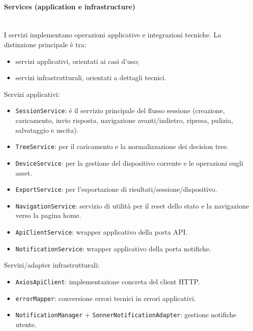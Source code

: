 \documentclass[a4paper,12pt]{article}
\begin{document}
            \paragraph{Services (application e infrastructure)}\mbox{}\\
                I servizi implementano operazioni applicative e integrazioni tecniche. La distinzione principale è tra:
                \begin{itemize}
                    \item servizi applicativi, orientati ai casi d'uso;
                    \item servizi infrastrutturali, orientati a dettagli tecnici.
                \end{itemize}
                Servizi applicativi:
                \begin{itemize}
                    \item \texttt{SessionService}: è il servizio principale del flusso sessione (creazione, caricamento, invio risposta, navigazione avanti/indietro, ripresa, pulizia, salvataggio e uscita).
                    \item \texttt{TreeService}: per il caricamento e la normalizzazione dei decision tree.
                    \item \texttt{DeviceService}: per la gestione del dispositivo corrente e le operazioni sugli asset.
                    \item \texttt{ExportService}: per l'esportazione di risultati/sessione/dispositivo.
                    \item \texttt{NavigationService}: servizio di utilità per il reset dello stato e la navigazione verso la pagina home.
                    \item \texttt{ApiClientService}: wrapper applicativo della porta API.
                    \item \texttt{NotificationService}: wrapper applicativo della porta notifiche.
                \end{itemize}
                Servizi/adapter infrastrutturali:
                \begin{itemize}
                    \item \texttt{AxiosApiClient}: implementazione concreta del client HTTP.
                    \item \texttt{errorMapper}: conversione errori tecnici in errori applicativi.
                    \item \texttt{NotificationManager} + \texttt{SonnerNotificationAdapter}: gestione notifiche utente.
                \end{itemize}
        
\end{document}
